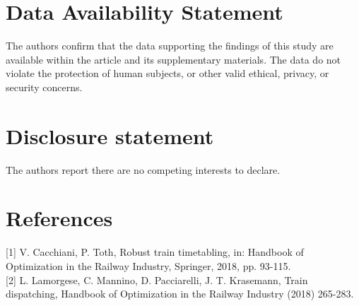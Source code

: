 \documentclass[10pt]{article}
\begin{document}
\section*{Data Availability Statement}
The authors confirm that the data supporting the findings of this study are available within the article and its supplementary materials. The data do not violate the protection of human subjects, or other valid ethical, privacy, or security concerns.

\section*{Disclosure statement}
The authors report there are no competing interests to declare.

\section*{References}
[1] V. Cacchiani, P. Toth, Robust train timetabling, in: Handbook of Optimization in the Railway Industry, Springer, 2018, pp. 93-115.\\[0pt]
[2] L. Lamorgese, C. Mannino, D. Pacciarelli, J. T. Krasemann, Train dispatching, Handbook of Optimization in the Railway Industry (2018) 265-283.
\end{document}
